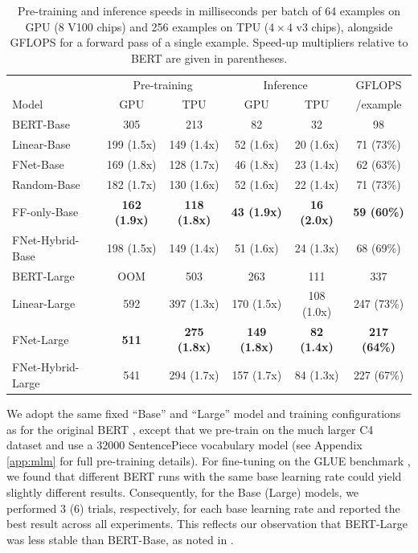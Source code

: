 \begin{table}[tb]
    \caption{Pre-training and inference speeds in milliseconds per batch of 64 examples on GPU ($8$ V100 chips) and 256 examples on TPU ($4\times4$ v3 chips), alongside GFLOPS for a forward pass of a single example. Speed-up multipliers relative to BERT are given in parentheses.}
    \label{tab:pretrain_speed}
    \centering
    \begin{tabular}{l | c c | c c | c}
        \hline
         & \multicolumn{2}{c|}{Pre-training} & \multicolumn{2}{c|}{Inference} & GFLOPS  \\  
         Model & GPU & TPU & GPU & TPU & /example \\ \hline \hline
         BERT-Base & 305 & 213 & 82  & 32 & 98 \\
         Linear-Base & 199 (1.5x) & 149 (1.4x) & 52 (1.6x)  & 20 (1.6x) & 71 (73\%) \\
         FNet-Base & 169 (1.8x) & 128 (1.7x) & 46 (1.8x) & 23 (1.4x) & 62 (63\%) \\
         Random-Base & 182 (1.7x) & 130 (1.6x) & 52 (1.6x) & 22 (1.4x) & 71 (73\%) \\
         FF-only-Base & \textbf{162 (1.9x)} & \textbf{118 (1.8x)} & \textbf{43 (1.9x)} & \textbf{16 (2.0x)} & \textbf{59 (60\%)} \\
         FNet-Hybrid-Base & 198 (1.5x) & 149 (1.4x) & 51 (1.6x) & 24 (1.3x) & 68 (69\%) \\ \hline
         BERT-Large & OOM & 503 & 263 & 111 & 337 \\
         Linear-Large & 592 & 397 (1.3x) & 170 (1.5x) & 108 (1.0x) & 247 (73\%) \\
         FNet-Large & \textbf{511} & \textbf{275 (1.8x)} & \textbf{149 (1.8x)} & \textbf{82 (1.4x)} & \textbf{217 (64\%)} \\ 
         FNet-Hybrid-Large & 541 & 294 (1.7x) & 157 (1.7x) & 84 (1.3x) & 227 (67\%)\\ \hline
    \end{tabular}
\end{table}

We adopt the same fixed ``Base'' and ``Large'' model and training configurations as for the original BERT \citep{devlin2018bert}, except that we pre-train on the much larger C4 dataset \citep{raffel2019exploring} and use a $32000$ SentencePiece vocabulary model \citep{kudo2018sentencepiece} (see Appendix \ref{app:mlm} for full pre-training details). For fine-tuning on the GLUE benchmark \citep{wang2018glue}, we found that different BERT runs with the same base learning rate could yield slightly different results. Consequently, for the Base (Large) models, we performed 3 (6) trials, respectively, for each base learning rate and reported the best result across all experiments. This reflects our observation that BERT-Large was less stable than BERT-Base, as noted in \citet{devlin2018bert}.

